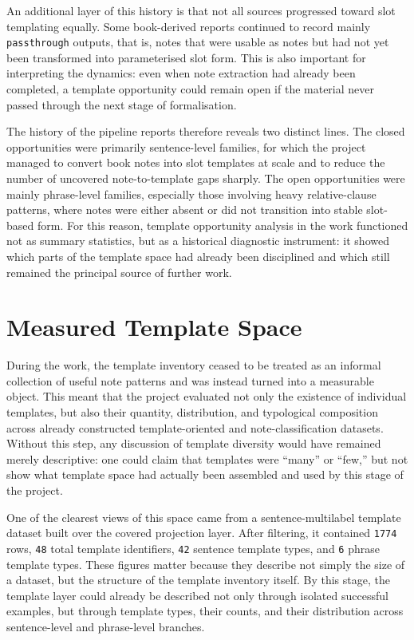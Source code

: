 \documentclass[12pt,a4paper,oneside]{report}
\begin{document}
An additional layer of this history is that not all sources progressed toward slot templating equally. Some book-derived reports continued to record mainly \texttt{passthrough} outputs, that is, notes that were usable as notes but had not yet been transformed into parameterised slot form. This is also important for interpreting the dynamics: even when note extraction had already been completed, a template opportunity could remain open if the material never passed through the next stage of formalisation.

The history of the pipeline reports therefore reveals two distinct lines. The closed opportunities were primarily sentence-level families, for which the project managed to convert book notes into slot templates at scale and to reduce the number of uncovered note-to-template gaps sharply. The open opportunities were mainly phrase-level families, especially those involving heavy relative-clause patterns, where notes were either absent or did not transition into stable slot-based form. For this reason, template opportunity analysis in the work functioned not as summary statistics, but as a historical diagnostic instrument: it showed which parts of the template space had already been disciplined and which still remained the principal source of further work.

\section{Measured Template Space}
During the work, the template inventory ceased to be treated as an informal collection of useful note patterns and was instead turned into a measurable object. This meant that the project evaluated not only the existence of individual templates, but also their quantity, distribution, and typological composition across already constructed template-oriented and note-classification datasets. Without this step, any discussion of template diversity would have remained merely descriptive: one could claim that templates were ``many'' or ``few,'' but not show what template space had actually been assembled and used by this stage of the project.

One of the clearest views of this space came from a sentence-multilabel template dataset built over the covered projection layer. After filtering, it contained \texttt{1774} rows, \texttt{48} total template identifiers, \texttt{42} sentence template types, and \texttt{6} phrase template types. These figures matter because they describe not simply the size of a dataset, but the structure of the template inventory itself. By this stage, the template layer could already be described not only through isolated successful examples, but through template types, their counts, and their distribution across sentence-level and phrase-level branches.
\end{document}
